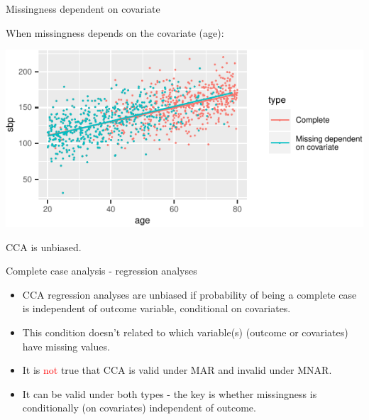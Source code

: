 \documentclass[ignorenonframetext,]{beamer}
\providecommand{\tightlist}{%
  \setlength{\itemsep}{0pt}\setlength{\parskip}{0pt}}
\begin{document}
\begin{frame}{Missingness dependent on covariate}
\protect\hypertarget{missingness-dependent-on-covariate}{}

When missingness depends on the covariate (age):

\begin{center}\includegraphics{Lecture2_files/figure-beamer/unnamed-chunk-12-1} \end{center}

CCA is unbiased.

\end{frame}

\begin{frame}{Complete case analysis - regression analyses}
\protect\hypertarget{complete-case-analysis---regression-analyses-1}{}

\begin{itemize}
\tightlist
\item
  CCA regression analyses are unbiased if probability of being a
  complete case is independent of outcome variable, conditional on
  covariates.
\item
  This condition doesn't related to which variable(s) (outcome or
  covariates) have missing values.
\item
  It is \textcolor{red}{not} true that CCA is valid under MAR and
  invalid under MNAR.
\item
  It can be valid under both types - the key is whether missingness is
  conditionally (on covariates) independent of outcome.
\end{itemize}

\end{frame}
\end{document}
